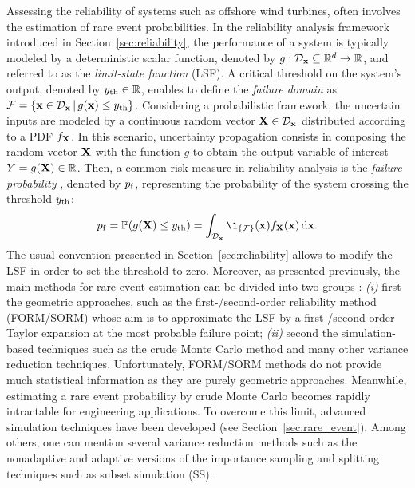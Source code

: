 Assessing the reliability of systems such as offshore wind turbines, often involves the estimation of rare event probabilities. 
In the reliability analysis framework introduced in Section~\ref{sec:reliability}, the performance of a system is typically modeled by a deterministic scalar function, denoted by $g: \mathcal{D}_{\bf x} \subseteq \mathbb{R}^d \rightarrow \mathbb{R}$, and referred to as the \textit{limit-state function} (LSF). 
A critical threshold on the system's output, denoted by $y_\mathrm{th} \in \mathbb{R}$, enables to define the \textit{failure domain} as $\mathcal{F} = \{{\bf x} \in \mathcal{D}_{\bf x} \, | \,  g({\bf x}) \leq y_\mathrm{th}\}$. 
Considering a probabilistic framework, the uncertain inputs are modeled by a continuous random vector ${\bf X} \in \mathcal{D}_{\bf x}$ distributed according to a PDF $f_{\bf X}$. 
In this scenario, uncertainty propagation consists in composing the random vector ${\bf X}$ with the function $g$ to obtain the output variable of interest $Y = g({\bf X}) \in \mathbb{R}$. 
Then, a common risk measure in reliability analysis is the \textit{failure probability} \citep{rockafellar_2015}, denoted by $p_\mathrm{f}$, representing the probability of the system crossing the threshold $y_\mathrm{th}$:
\begin{equation}
    \label{eq:failure_proba_c6}
    \pf = \P(g(\bX) \leq \yth)
        = \int_{\iD_\bx} \1_{\{\iF\}}(\bx) f_\bX(\bx) \, \dd\bx.
\end{equation}
The usual convention presented in Section~\ref{sec:reliability} allows to modify the LSF in order to set the threshold to zero. 
Moreover, as presented previously, the main methods for rare event estimation can be divided into two groups \citep{MorioBalesdent2015}: 
\textit{(i)} first the geometric approaches, such as the first-/second-order reliability method (FORM/SORM) whose aim is to approximate the LSF by a first-/second-order Taylor expansion at the most probable failure point; 
\textit{(ii)} second the simulation-based techniques such as the crude Monte Carlo method and many other variance reduction techniques. 
Unfortunately, FORM/SORM methods do not provide much statistical information as they are purely geometric approaches. 
Meanwhile, estimating a rare event probability by crude Monte Carlo becomes rapidly intractable for engineering applications. 
To overcome this limit, advanced simulation techniques have been developed (see Section~\ref{sec:rare_event}). 
Among others, one can mention several variance reduction methods such as the nonadaptive and adaptive versions of the importance sampling \citep{RubinsteinKroese1981} and splitting techniques \citep{cerou2012sequential} such as subset simulation (SS) \citep{AuBeck2001}.

